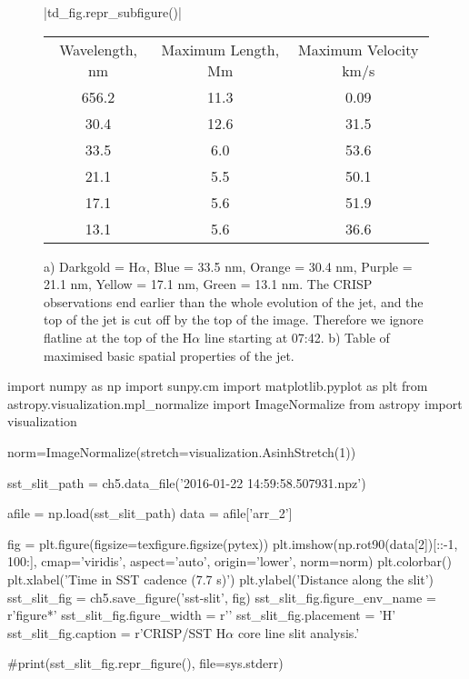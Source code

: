 \begin{figure}[H]
	\centering
	\py[chapter5]|td_fig.repr_subfigure()|
	
	\begin{subtable}[b]{\textwidth}
		\centering
		\begin{tabular}{ccc}
		Wavelength, nm & Maximum Length, Mm & Maximum Velocity km/s \\
		656.2 & 11.3 & 0.09 \\
		30.4 & 12.6 & 31.5 \\
		33.5 & 6.0 & 53.6 \\
		21.1 & 5.5 & 50.1 \\
		17.1 & 5.6 & 51.9 \\
		13.1 & 5.6 & 36.6 \\
		\end{tabular}
		\caption{}
	\end{subtable}
	\caption{a) Darkgold = H$\alpha$, Blue = 33.5 nm, Orange = 30.4 nm, Purple = 21.1 nm, Yellow = 17.1 nm, Green = 13.1 nm. The CRISP observations end earlier than the whole evolution of the jet, and the top of the jet is cut off by the top of the image. Therefore we ignore flatline at the top of the H$\alpha$ line starting at 07:42. b) Table of maximised basic spatial properties of the jet.}
\end{figure}


\begin{pycode}[chapter5]
import numpy as np
import sunpy.cm
import matplotlib.pyplot as plt
from astropy.visualization.mpl_normalize import ImageNormalize 
from astropy import visualization

norm=ImageNormalize(stretch=visualization.AsinhStretch(1))

sst_slit_path = ch5.data_file('2016-01-22 14:59:58.507931.npz')

afile = np.load(sst_slit_path)
data = afile['arr_2']

fig = plt.figure(figsize=texfigure.figsize(pytex))
plt.imshow(np.rot90(data[2])[::-1, 100:], cmap='viridis', aspect='auto', origin='lower', norm=norm)
plt.colorbar()
plt.xlabel('Time in SST cadence (7.7 s)')
plt.ylabel('Distance along the slit')
sst_slit_fig = ch5.save_figure('sst-slit', fig)
sst_slit_fig.figure_env_name = r'figure*'
sst_slit_fig.figure_width = r'\columnwidth'
sst_slit_fig.placement = 'H'
sst_slit_fig.caption = r'CRISP/SST H$\alpha$ core line slit analysis.'

#print(sst_slit_fig.repr_figure(), file=sys.stderr)
\end{pycode}

